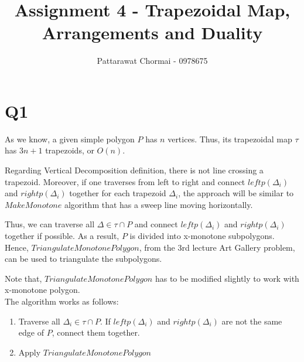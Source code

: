 \documentclass[12pt]{article}
\begin{document}
\title{Assignment 4 - Trapezoidal Map, Arrangements and Duality }
\author{
	Pattarawat Chormai - 0978675 \\
}
\maketitle

\section*{Q1}

As we know, a given simple polygon $P$ has $n$ vertices. Thus, its trapezoidal
map $\tau$ has $3n+1$ trapezoids, or $O(n)$.

Regarding Vertical Decomposition definition, there is not line crossing a
trapezoid. Moreover, if one traverses from left to right and connect $leftp(\Delta_i)$
and $rightp(\Delta_i)$ together for each trapezoid $\Delta_i$, the approach will be similar
to $MakeMonotone$ algorithm that has a sweep line moving horizontally.


Thus, we can traverse all $\Delta \in \tau \cap P$ and connect $leftp(\Delta_i)$ and
$rightp(\Delta_i)$ together if possible. As a result, $P$ is divided into x-monotone
subpolygons. Hence, $TriangulateMonotonePolygon$, from the 3rd lecture Art Gallery problem,
can be used to triangulate the subpolygons.


Note that, $TriangulateMonotonePolygon$ has to
be modified slightly to work with x-monotone polygon. \\


The algorithm works as follows:

\begin{enumerate}
    \item Traverse all $\Delta_i \in \tau \cap P$. If $leftp(\Delta_i)$
    and $rightp(\Delta_i)$ are not the same edge of $P$, connect them together.
    \item Apply $TriangulateMonotonePolygon$
\end{enumerate}

% 
\end{document}
